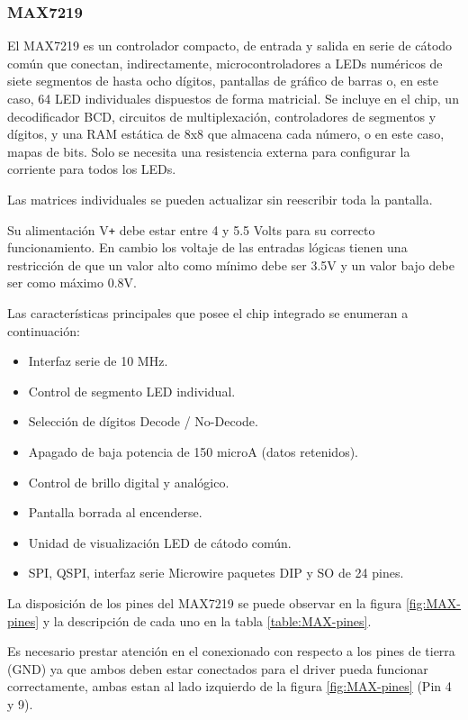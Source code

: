 \subsubsection{MAX7219}
El MAX7219 es un controlador compacto, de entrada y salida en serie de cátodo común que conectan, indirectamente, microcontroladores a LEDs numéricos de siete segmentos de hasta ocho dígitos, pantallas de gráfico de barras o, en este caso, 64 LED individuales dispuestos de forma matricial. Se incluye en el chip, un decodificador BCD, circuitos de multiplexación, controladores de segmentos y dígitos, y una RAM estática de 8x8 que almacena cada número, o en este caso, mapas de bits. Solo se necesita una resistencia externa para configurar la corriente para todos los LEDs.

Las matrices individuales se pueden actualizar sin reescribir toda la pantalla.

Su alimentación V\texttt{+} debe estar entre 4 y 5.5 Volts para su correcto funcionamiento. En cambio los voltaje de las entradas lógicas tienen una restricción de que un valor alto como mínimo debe ser 3.5V y un valor bajo debe ser como máximo 0.8V.

Las características principales que posee el chip integrado se enumeran a continuación:
\begin{itemize}
	\item Interfaz serie de 10 MHz.
	\item Control de segmento LED individual.
	\item Selección de dígitos Decode / No-Decode.
	\item Apagado de baja potencia de 150 microA (datos retenidos).
	\item Control de brillo digital y analógico.
	\item Pantalla borrada al encenderse.
	\item Unidad de visualización LED de cátodo común.
	\item SPI, QSPI, interfaz serie Microwire paquetes DIP y SO de 24 pines.
\end{itemize}

La disposición de los pines del MAX7219 se puede observar en la figura \ref{fig:MAX-pines} y la descripción de cada uno en la tabla \ref{table:MAX-pines}.

Es necesario prestar atención en el conexionado con respecto a los pines de tierra (GND) ya que ambos deben estar conectados para el driver pueda funcionar correctamente, ambas estan al lado izquierdo de la figura \ref{fig:MAX-pines} (Pin 4 y 9).

